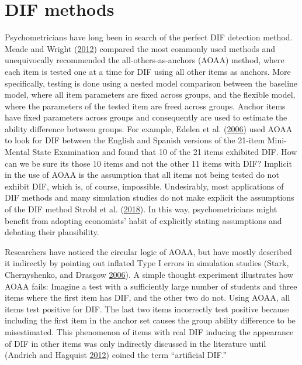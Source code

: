 \documentclass[
  11pt,
]{article}
\begin{document}
\hypertarget{dif-methods}{%
\section{DIF methods}\label{dif-methods}}

Psychometricians have long been in search of the perfect DIF detection method. Meade and Wright (\protect\hyperlink{ref-meade2012solving}{2012}) compared the most commonly used methods and unequivocally recommended the all-others-as-anchors (AOAA) method, where each item is tested one at a time for DIF using all other items as anchors. More specifically, testing is done using a nested model comparison between the baseline model, where all item parameters are fixed across groups, and the flexible model, where the parameters of the tested item are freed across groups. Anchor items have fixed parameters across groups and consequently are used to estimate the ability difference between groups. For example, Edelen et al. (\protect\hyperlink{ref-edelen2006identification}{2006}) used AOAA to look for DIF between the English and Spanish versions of the 21-item Mini-Mental State Examination and found that 10 of the 21 items exhibited DIF. How can we be sure its those 10 items and not the other 11 items with DIF? Implicit in the use of AOAA is the assumption that all items not being tested do not exhibit DIF, which is, of course, impossible. Undesirably, most applications of DIF methods and many simulation studies do not make explicit the assumptions of the DIF method Strobl et al. (\protect\hyperlink{ref-strobl2018anchor}{2018}). In this way, psychometricians might benefit from adopting economists' habit of explicitly stating assumptions and debating their plausibility.

Researchers have noticed the circular logic of AOAA, but have mostly described it indirectly by pointing out inflated Type I errors in simulation studies (Stark, Chernyshenko, and Drasgow \protect\hyperlink{ref-stark2006detecting}{2006}). A simple thought experiment illustrates how AOAA fails: Imagine a test with a sufficiently large number of students and three items where the first item has DIF, and the other two do not. Using AOAA, all items test positive for DIF. The last two items incorrectly test positive because including the first item in the anchor set causes the group ability difference to be misestimated. This phenomenon of items with real DIF inducing the appearance of DIF in other items was only indirectly discussed in the literature until (Andrich and Hagquist \protect\hyperlink{ref-andrich2012real}{2012}) coined the term \enquote{artificial DIF.}
\end{document}
